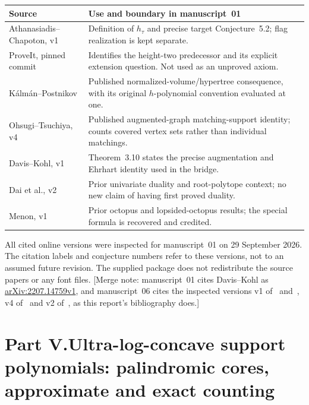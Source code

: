 \documentclass[11pt]{article}
\numberwithin{equation}{section}
\theoremstyle{definition}
\newcommand{\arxiv}[1]{\href{https://arxiv.org/abs/#1}{arXiv:#1}}
\begin{document}
\begin{center}
\small
\begin{tabularx}{\textwidth}{@{}>{\raggedright\arraybackslash}p{}Y@{}}
\toprule
Source & Use and boundary in manuscript~01\\
\midrule
Athanasiadis--Chapoton, v1 & Definition of $h_\tau$ and precise target
Conjecture~5.2; flag realization is kept separate.\\
ProveIt, pinned commit & Identifies the height-two predecessor and its explicit
extension question. Not used as an unproved axiom.\\
K\'alm\'an--Postnikov & Published normalized-volume/hypertree consequence,
with its original $h$-polynomial convention evaluated at one.\\
Ohsugi--Tsuchiya, v4 & Published augmented-graph matching-support identity;
counts covered vertex sets rather than individual matchings.\\
Davis--Kohl, v1 & Theorem~3.10 states the precise augmentation and Ehrhart
identity used in the bridge.\\
Dai et al., v2 & Prior univariate duality and root-polytope context; no new
claim of having first proved duality.\\
Menon, v1 & Prior octopus and lopsided-octopus results; the special formula is
recovered and credited.\\
\bottomrule
\end{tabularx}
\end{center}
All cited online versions were inspected for manuscript~01 on
29 September 2026. The citation labels and conjecture numbers refer to these
versions, not to an assumed future revision. The supplied package does not
redistribute the source papers or any font files.
[Merge note: manuscript~01 cites Davis--Kohl as \arxiv{2207.14759v1}, and
manuscript~06 cites the inspected versions v1 of~\cite{AC} and~\cite{Menon},
v4 of~\cite{OT20} and v2 of~\cite{DHLTW}, as this report's bibliography
does.]

\clearpage
{}\part*{Part V.\quad Ultra-log-concave support polynomials: palindromic cores, approximate and exact counting}
\end{document}
